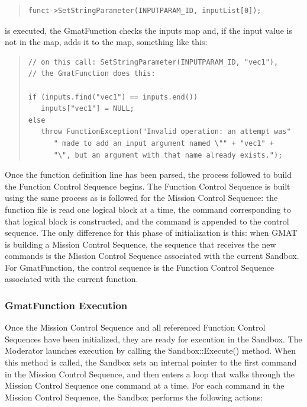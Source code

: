\begin{quote}
\begin{verbatim}
funct->SetStringParameter(INPUTPARAM_ID, inputList[0]);
\end{verbatim}
\end{quote} 

\noindent is executed, the GmatFunction checks the inputs map and, if the input value is not in the
map, adds it to the map, something like this:

\begin{quote}
\begin{verbatim}
// on this call: SetStringParameter(INPUTPARAM_ID, "vec1"),
// the GmatFunction does this:

if (inputs.find("vec1") == inputs.end())
   inputs["vec1"] = NULL;
else
   throw FunctionException("Invalid operation: an attempt was"
      " made to add an input argument named \"" + "vec1" +
      "\", but an argument with that name already exists.");
\end{verbatim}
\end{quote}

Once the function definition line has been parsed, the process followed to build the Function
Control Sequence begins.  The Function Control Sequence is built using the same process as is
followed for the Mission Control Sequence: the function file is read one logical block at a time,
the command corresponding to that logical block is constructed, and the command is appended to the
control sequence.  The only difference for this phase of initialization is this: when GMAT is
building a Mission Control Sequence, the sequence that receives the new commands is the Mission
Control Sequence associated with the current Sandbox.  For GmatFunction, the control sequence is the
Function Control Sequence associated with the current function.

\subsubsection{GmatFunction Execution}

Once the Mission Control Sequence and all referenced Function Control Sequences have been
initialized, they are ready for execution in the Sandbox.  The Moderator launches execution by
calling the Sandbox::Execute() method.  When this method is called, the Sandbox sets an internal
pointer to the first command in the Mission Control Sequence, and then enters a loop that walks
through the Mission Control Sequence one command at a time.  For each command in the Mission Control
Sequence, the Sandbox performs the following actions:

